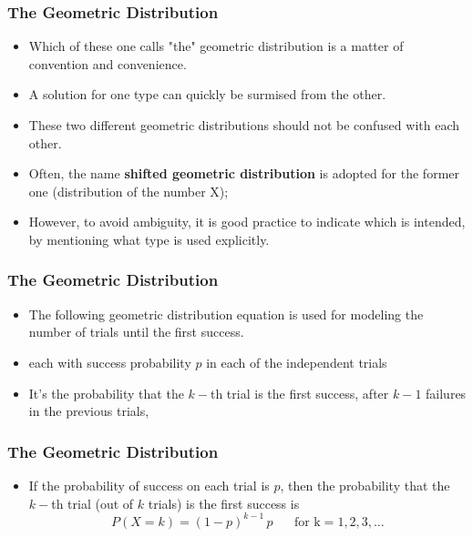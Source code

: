 \documentclass{beamer}
\begin{document}
\begin{frame}
\frametitle{The Geometric Distribution}
\Large
\begin{itemize}
\item Which of these one calls "the" geometric distribution is a matter of convention and convenience. 
\item A solution for one type can quickly be surmised from the other.
\item These two different geometric distributions should not be confused with each other. 
\item Often, the name \textbf{shifted geometric distribution} is adopted for the former one (distribution of the number X); 
\item However, to avoid ambiguity, it is good practice to indicate which is intended, by mentioning what type is used explicitly.
\end{itemize}
\end{frame}
\begin{frame}
\frametitle{The Geometric Distribution}
\Large
\begin{itemize}
\item The following geometric distribution equation is used for modeling the number of trials until the first success. 

\item each with success probability $p$ in each of the independent trials 
 
\item It’s the probability that the $k-$th trial is the first success, after $k-1$ failures in the previous trials, 
\end{itemize}
\end{frame}
\begin{frame}
\frametitle{The Geometric Distribution}
\Large
\begin{itemize}
\item If the probability of success on each trial is $p$, then the probability that the $k-$th trial (out of $k$ trials) is the first success is
\[P(X = k) = (1-p)^{k-1}\,p\, \phantom{spa} \mbox{for k} = 1, 2, 3, \ldots \]



\end{itemize}
\end{frame}
\end{document}
